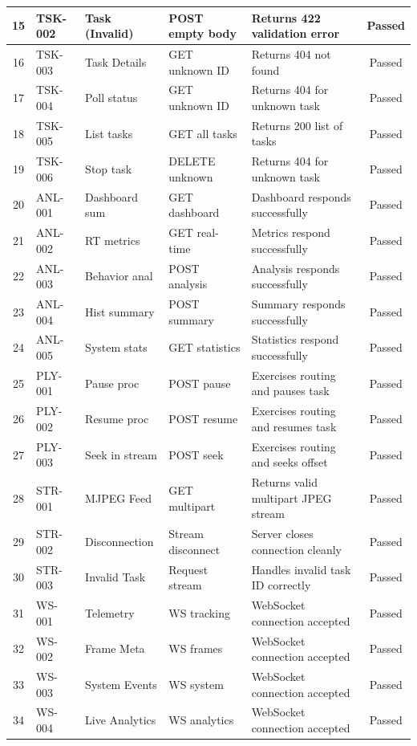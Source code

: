 \begin{longtable}{|c|p{1.5cm}|p{3.5cm}|p{3.5cm}|p{3.5cm}|c|}
15 & TSK-002 & Task (Invalid) & POST empty body & Returns 422 validation error & Passed \\ \hline
16 & TSK-003 & Task Details & GET unknown ID & Returns 404 not found & Passed \\ \hline
17 & TSK-004 & Poll status & GET unknown ID & Returns 404 for unknown task & Passed \\ \hline
18 & TSK-005 & List tasks & GET all tasks & Returns 200 list of tasks & Passed \\ \hline
19 & TSK-006 & Stop task & DELETE unknown & Returns 404 for unknown task & Passed \\ \hline
20 & ANL-001 & Dashboard sum & GET dashboard & Dashboard responds successfully & Passed \\ \hline
21 & ANL-002 & RT metrics & GET real-time & Metrics respond successfully & Passed \\ \hline
22 & ANL-003 & Behavior anal & POST analysis & Analysis responds successfully & Passed \\ \hline
23 & ANL-004 & Hist summary & POST summary & Summary responds successfully & Passed \\ \hline
24 & ANL-005 & System stats & GET statistics & Statistics respond successfully & Passed \\ \hline
25 & PLY-001 & Pause proc & POST pause & Exercises routing and pauses task & Passed \\ \hline
26 & PLY-002 & Resume proc & POST resume & Exercises routing and resumes task & Passed \\ \hline
27 & PLY-003 & Seek in stream & POST seek & Exercises routing and seeks offset & Passed \\ \hline
28 & STR-001 & MJPEG Feed & GET multipart & Returns valid multipart JPEG stream & Passed \\ \hline
29 & STR-002 & Disconnection & Stream disconnect & Server closes connection cleanly & Passed \\ \hline
30 & STR-003 & Invalid Task & Request stream & Handles invalid task ID correctly & Passed \\ \hline
31 & WS-001 & Telemetry & WS tracking & WebSocket connection accepted & Passed \\ \hline
32 & WS-002 & Frame Meta & WS frames & WebSocket connection accepted & Passed \\ \hline
33 & WS-003 & System Events & WS system & WebSocket connection accepted & Passed \\ \hline
34 & WS-004 & Live Analytics & WS analytics & WebSocket connection accepted & Passed \\ \hline

\end{longtable}
